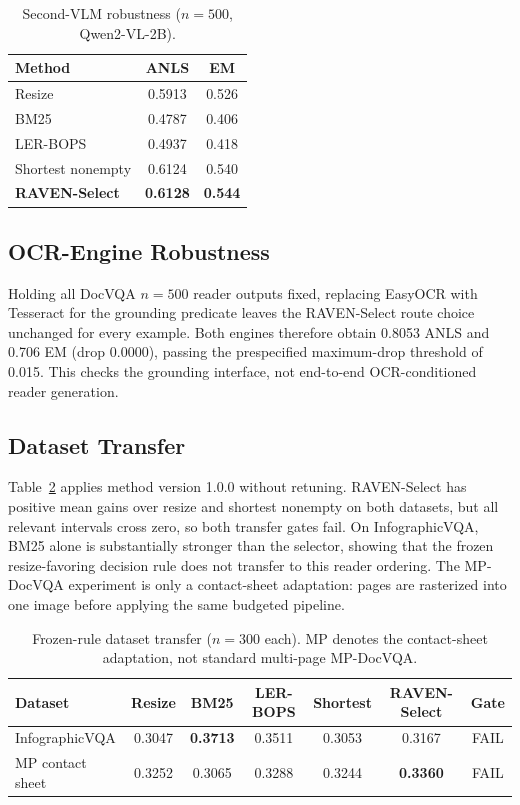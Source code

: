 \documentclass[journal]{IEEEtran}
\begin{document}
\begin{table}[t]
\centering
\caption{Second-VLM robustness ($n=500$, Qwen2-VL-2B).}
\label{tab:qwen2}
\begin{tabular}{lcc}
\toprule
Method & ANLS & EM\\
\midrule
Resize & 0.5913 & 0.526\\
BM25 & 0.4787 & 0.406\\
LER-BOPS & 0.4937 & 0.418\\
Shortest nonempty & 0.6124 & 0.540\\
\textbf{RAVEN-Select} & \textbf{0.6128} & \textbf{0.544}\\
\bottomrule
\end{tabular}
\end{table}

\subsection{OCR-Engine Robustness}
Holding all DocVQA $n=500$ reader outputs fixed, replacing EasyOCR with
Tesseract for the grounding predicate leaves the RAVEN-Select route choice
unchanged for every example.  Both engines therefore obtain 0.8053 ANLS and
0.706 EM (drop 0.0000), passing the prespecified maximum-drop threshold of
0.015.  This checks the grounding interface, not end-to-end OCR-conditioned
reader generation.

\subsection{Dataset Transfer}
Table~\ref{tab:transfer} applies method version 1.0.0 without retuning.
RAVEN-Select has positive mean gains over resize and shortest nonempty on both
datasets, but all relevant intervals cross zero, so both transfer gates fail.
On InfographicVQA, BM25 alone is substantially stronger than the selector,
showing that the frozen resize-favoring decision rule does not transfer to this
reader ordering.  The MP-DocVQA experiment is only a contact-sheet adaptation:
pages are rasterized into one image before applying the same budgeted pipeline.

\begin{table}[t]
\centering
\caption{Frozen-rule dataset transfer ($n=300$ each).  MP denotes the
contact-sheet adaptation, not standard multi-page MP-DocVQA.}
\label{tab:transfer}
\begin{tabular}{lcccccc}
\toprule
Dataset & Resize & BM25 & LER-BOPS & Shortest & RAVEN-Select & Gate\\
\midrule
InfographicVQA & 0.3047 & \textbf{0.3713} & 0.3511 & 0.3053 & 0.3167 & FAIL\\
MP contact sheet & 0.3252 & 0.3065 & 0.3288 & 0.3244 & \textbf{0.3360} & FAIL\\
\bottomrule
\end{tabular}
\end{table}
\end{document}
